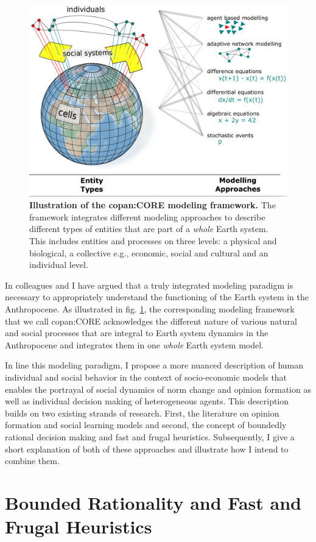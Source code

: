 \begin{figure}[t]
  \centering
  \includegraphics[width = .8 \textwidth]{figures/CORE.png}
  \caption{\textbf{Illustration of the copan:CORE modeling framework.} The framework integrates different modeling approaches to describe different types of entities that are part of a \emph{whole} Earth system. This includes entities and processes on three levels: a physical and biological, a collective e.g., economic, social and cultural and an individual level.}
  \label{fig:Core}
\end{figure}
In \citep{Donges2018} colleagues and I have argued that a truly integrated modeling paradigm is necessary to appropriately understand the functioning of the Earth system in the Anthropocene. As illustrated in fig. \ref{fig:Core}, the corresponding modeling framework that we call copan:CORE acknowledges the different nature of various natural and social processes that are integral to Earth system dynamics in the Anthropocene and integrates them in one \emph{whole} Earth system model.

In line this modeling paradigm, I propose a more nuanced description of human individual and social behavior in the context of socio-economic models that enables the portrayal of social dynamics of norm change and opinion formation as well as individual decision making of heterogeneous agents. 
This description builds on two existing strands of research. First, the literature on opinion formation and social learning models and second, the concept of boundedly rational decision making and fast and frugal heuristics. Subsequently, I give a short explanation of both of these approaches and illustrate how I intend to combine them.

\section{Bounded Rationality and Fast and Frugal Heuristics}
\label{sec:intro_bounded_rationality} 

